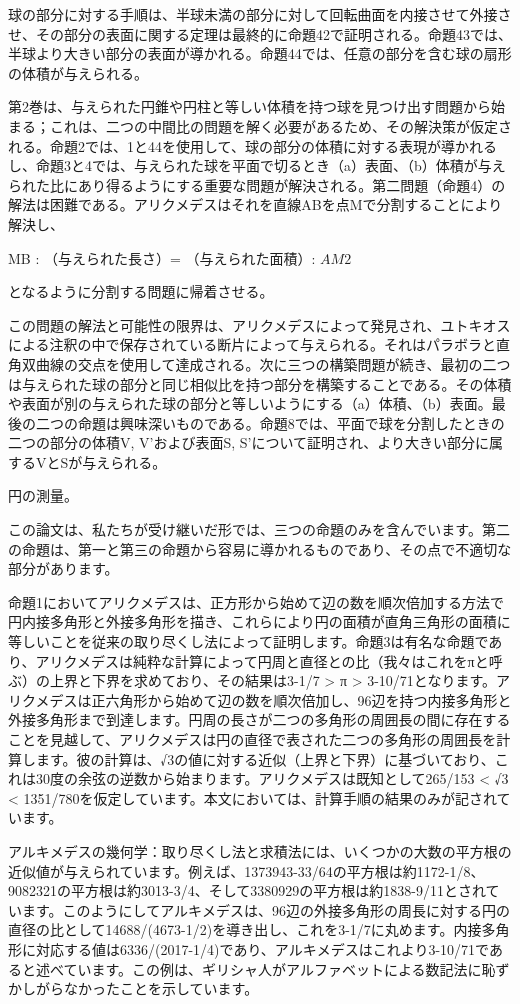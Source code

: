 \documentclass[a4paper,11pt,openany]{ltjsbook}
\begin{document}
球の部分に対する手順は、半球未満の部分に対して回転曲面を内接させて外接させ、その部分の表面に関する定理は最終的に命題42で証明される。命題43では、半球より大きい部分の表面が導かれる。命題44では、任意の部分を含む球の扇形の体積が与えられる。

第2巻は、与えられた円錐や円柱と等しい体積を持つ球を見つけ出す問題から始まる；これは、二つの中間比の問題を解く必要があるため、その解決策が仮定される。命題2では、1と44を使用して、球の部分の体積に対する表現が導かれるし、命題3と4では、与えられた球を平面で切るとき（a）表面、（b）体積が与えられた比にあり得るようにする重要な問題が解決される。第二問題（命題4）の解法は困難である。アリクメデスはそれを直線ABを点Mで分割することにより解決し、

MB : （与えられた長さ）= （与えられた面積）: $AM{2}$

となるように分割する問題に帰着させる。

この問題の解法と可能性の限界は、アリクメデスによって発見され、ユトキオスによる注釈の中で保存されている断片によって与えられる。それはパラボラと直角双曲線の交点を使用して達成される。次に三つの構築問題が続き、最初の二つは与えられた球の部分と同じ相似比を持つ部分を構築することである。その体積や表面が別の与えられた球の部分と等しいようにする（a）体積、（b）表面。最後の二つの命題は興味深いものである。命題8では、平面で球を分割したときの二つの部分の体積V, V'および表面S, S'について証明され、より大きい部分に属するVとSが与えられる。

円の測量。

この論文は、私たちが受け継いだ形では、三つの命題のみを含んでいます。第二の命題は、第一と第三の命題から容易に導かれるものであり、その点で不適切な部分があります。

命題1においてアリクメデスは、正方形から始めて辺の数を順次倍加する方法で円内接多角形と外接多角形を描き、これらにより円の面積が直角三角形の面積に等しいことを従来の取り尽くし法によって証明します。命題3は有名な命題であり、アリクメデスは純粋な計算によって円周と直径との比（我々はこれをπと呼ぶ）の上界と下界を求めており、その結果は3-1/7 > π > 3-10/71となります。アリクメデスは正六角形から始めて辺の数を順次倍加し、96辺を持つ内接多角形と外接多角形まで到達します。円周の長さが二つの多角形の周囲長の間に存在することを見越して、アリクメデスは円の直径で表された二つの多角形の周囲長を計算します。彼の計算は、√3の値に対する近似（上界と下界）に基づいており、これは30度の余弦の逆数から始まります。アリクメデスは既知として265/153 < √3 < 1351/780を仮定しています。本文においては、計算手順の結果のみが記されています。

アルキメデスの幾何学：取り尽くし法と求積法には、いくつかの大数の平方根の近似値が与えられています。例えば、1373943-33/64の平方根は約1172-1/8、9082321の平方根は約3013-3/4、そして3380929の平方根は約1838-9/11とされています。このようにしてアルキメデスは、96辺の外接多角形の周長に対する円の直径の比として14688/(4673-1/2)を導き出し、これを3-1/7に丸めます。内接多角形に対応する値は6336/(2017-1/4)であり、アルキメデスはこれより3-10/71であると述べています。この例は、ギリシャ人がアルファベットによる数記法に恥ずかしがらなかったことを示しています。
\end{document}

